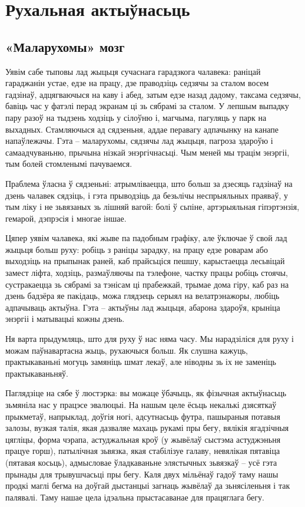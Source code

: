\chapter{Рухальная актыўнасьць}

\section{«Маларухомы» мозг}

Уявім сабе тыповы лад жыцьця сучаснага гарадзкога чалавека: раніцай гараджанін устае, едзе на працу, дзе праводзіць седзячы за сталом восем гадзінаў, адцягваючыся на каву і абед, затым едзе назад дадому, таксама седзячы, бавіць час у фатэлі перад экранам ці зь сябрамі за сталом. У лепшым выпадку пару разоў на тыдзень ходзіць у сілоўню і, магчыма, пагуляць у парк на выхадных. Стамляючыся ад сядзеньня, аддае перавагу адпачынку на канапе напаўлежачы. Гэта – маларухомы, сядзячы лад жыцьця, пагроза здароўю і самаадчуваньню, прычына нізкай энэргічнасьці. Чым меней мы трацім энэргіі, тым болей стомленымі пачуваемся.

Праблема ўласна ў сядзеньні: атрымліваецца, што больш за дзесяць гадзінаў на дзень чалавек сядзіць, і гэта прыводзіць да безьлічы неспрыяльных праяваў, у тым ліку і не зьвязаных зь лішняй вагой: болі ў сьпіне, артэрыяльная гіпэртэнзія, гемарой, дэпрэсія і многае іншае.

Цяпер уявім чалавека, які жыве па падобным графіку, але ўключае ў свой лад жыцьця больш руху: робіць з раніцы зарадку, на працу едзе роварам або выходзіць на прыпынак раней, каб прайсьціся пешшу, карыстаецца лесьвіцай замест ліфта, ходзіць, размаўляючы па тэлефоне, частку працы робіць стоячы, сустракаецца зь сябрамі за тэнісам ці прабежкай, трымае дома гіру, каб раз на дзень бадзёра яе пакідаць, можа глядзець серыял на велатрэнажоры, любіць адпачываць актыўна. Гэта – актыўны лад жыцьця, абарона здароўя, крыніца энэргіі і матывацыі кожны дзень.

Ня варта прыдумляць, што для руху ў нас няма часу. Мы нарадзіліся для руху і можам паўнавартасна жыць, рухаючыся больш. Як слушна кажуць, практыкаваньні могуць замяніць шмат лекаў, але ніводны зь іх не заменіць практыкаваньняў.

Паглядзіце на сябе ў люстэрка: вы можаце ўбачыць, як фізычная актыўнасьць зьмяніла нас у працэсе эвалюцыі. На нашым целе ёсьць некалькі дзясяткаў прыкметаў, напрыклад, доўгія ногі, адсутнасьць футра, пашыраныя потавыя залозы, вузкая талія, якая дазваляе махаць рукамі пры бегу, вялікія ягадзічныя цягліцы, форма чэрапа, астуджальная кроў (у жывёлаў сыстэма астуджэньня працуе горш), патылічная зьвязка, якая стабілізуе галаву, невялікая пятавіца (пятавая косьць), адмысловае ўладкаваньне элястычных зьвязкаў – усё гэта прынады для трывушчасьці пры бегу. Каля двух мільёнаў гадоў таму нашы продкі маглі бегма на доўгай дыстанцыі загнаць жывёлаў да зьнясіленьня і так палявалі. Таму нашае цела ідэальна прыстасаванае для працяглага бегу.

